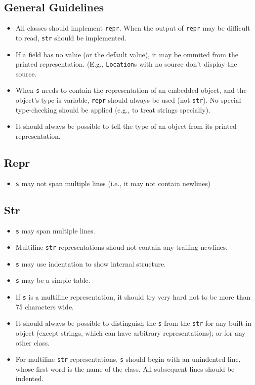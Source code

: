 \documentclass[11pt]{article}
\begin{document}
  \subsection{General Guidelines}
    \begin{itemize}
      \item All classes should implement \texttt{repr}.  When the
        output of \texttt{repr} may be difficult to read, \texttt{str}
        should be implemented.
      \item If a field has no value (or the default value), it may be
        ommited from the printed representation.  (E.g.,
        \texttt{Location}s with no source don't display the source.
      \item When \texttt{s} needs to contain the representation of an
        embedded object, and the object's type is variable,
        \texttt{repr} should always be used (not \texttt{str}).  No
        special type-checking should be applied (e.g., to treat
        strings specially).
      \item It should always be possible to tell the type of an object
          from its printed representation.
    \end{itemize}

  \subsection{Repr}
    \begin{itemize}
      \item \texttt{s} may not span multiple lines (i.e., it may not
        contain newlines)
    \end{itemize}

  \subsection{Str}
    \begin{itemize}
      \item \texttt{s} may span multiple lines.
      \item Multiline \texttt{str} representations shoud not contain any
        trailing newlines.
      \item \texttt{s} may use indentation to show internal structure.
      \item \texttt{s} may be a simple table.
      \item If \texttt{s} is a multiline representation, it should try 
        very hard not to be more than 75 characters wide.
      \item It should always be possible to distinguish the
          \texttt{s} from the \texttt{str} for any built-in object
          (except strings, which can have arbitrary representations);
          or for any other class.
      \item For multiline \texttt{str} representations, \texttt{s}
        should begin with an unindented line, whose first word is the
        name of the class.  All subsequent lines should be indented.
    \end{itemize}
\end{document}
